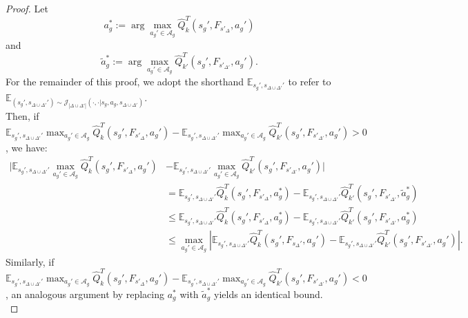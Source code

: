 \documentclass{article}
\theoremstyle{plain}
\theoremstyle{definition}
\def\E{\mathbb{E}}
\begin{document}
\begin{proof} Let
\[a_g^* := \arg\max_{a_g'\in\mathcal{A}_g}\hat{Q}_k^T(s_g', F_{s'_\Delta}, a_g')\]
and
\[\tilde{a}_g^* := \arg\max_{a_g'\in\mathcal{A}_g}\hat{Q}_{k'}^T(s_g', F_{s'_{\Delta'}}, a_g').\]
For the remainder of this proof, we adopt the shorthand $\E_{s_g',s_{\Delta\cup\Delta'}'}$ to refer to $\E_{(s_g',s_{\Delta\cup\Delta'}')\sim \mathcal{J}_{|\Delta\cup\Delta'|}(\cdot,\cdot|s_g, a_g, s_{\Delta\cup\Delta'})}$.\\

Then, if $\E_{s_g',s_{\Delta\cup\Delta'}'} \max_{a_g'\in\mathcal{A}_g}\hat{Q}_k^T(s_g', F_{s'_\Delta}, a_g') - \E_{s_g',s_{\Delta\cup\Delta'}'}\max_{a_g'\in\mathcal{A}_g}\hat{Q}_{k'}^T(s_g', F_{s'_{\Delta'}}, a_g')>0$, we have:
\begin{align*}
|\E_{s_g',s_{\Delta\cup\Delta'}'} \max_{a_g'\in\mathcal{A}_g}\hat{Q}_k^T(s_g', F_{s'_\Delta}, a_g') &- \E_{s_g',s_{\Delta\cup\Delta'}'}\max_{a_g'\in\mathcal{A}_g}\hat{Q}_{k'}^T(s_g', F_{s'_{\Delta'}}, a_g')| \\
&= \E_{s_g',s_{\Delta\cup\Delta'}'} \hat{Q}_k^T(s_g', F_{s'_\Delta}, a_g^*) -\E_{s_g',s_{\Delta\cup\Delta'}'} \hat{Q}_{k'}^T(s_g', F_{s'_{\Delta'}}, \tilde{a}_g^*) \\
&\leq \E_{s_g',s_{\Delta\cup\Delta'}'}\hat{Q}^T_k(s_g', F_{s'_\Delta}, a_g^*) - \E_{s_g',s_{\Delta\cup\Delta'}'} \hat{Q}_{k'}^T(s_g', F_{s'_{\Delta'}}, a_g^*) \\
&\leq \max_{a_g'\in\mathcal{A}_g}|\E_{s_g',s_{\Delta\cup\Delta'}'}\hat{Q}_k^T(s_g', F_{s_\Delta'}, a_g') - \E_{s_g',s_{\Delta\cup\Delta'}'}\hat{Q}_{k'}^T(s_g', F_{s'_{\Delta'}}, a_g')|.
\end{align*}
Similarly, if $\E_{s_g',s_{\Delta\cup\Delta'}'} \max_{a_g'\in\mathcal{A}_g}\hat{Q}_k^T(s_g', F_{s'_\Delta}, a_g') - \E_{s_g',s_{\Delta\cup\Delta'}'}\max_{a_g'\in\mathcal{A}_g}\hat{Q}_{k'}^T(s_g', F_{s'_{\Delta'}}, a_g')<0$, an analogous argument by replacing $a_g^*$ with $\tilde{a}_g^*$ yields an identical bound. \qedhere  \\
\end{proof}
\end{document}
